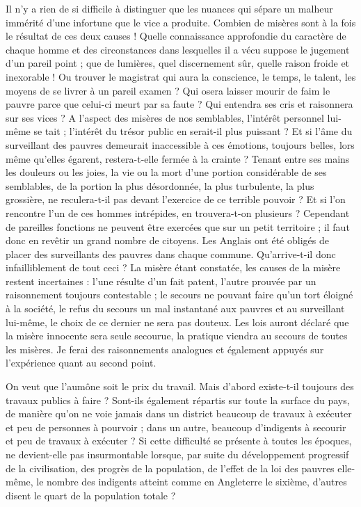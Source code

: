 \documentclass[french,twoside]{book} %
\begin{document}
Il n’y a rien de si difficile à distinguer que les nuances qui sépare un malheur immérité d’une infortune que le vice a produite. Combien de misères sont à la fois le résultat de ces deux causes ! Quelle connaissance approfondie du caractère de chaque homme et des circonstances dans lesquelles il a vécu suppose le jugement d’un pareil point ; que de lumières, quel discernement sûr, quelle raison froide et inexorable ! Ou trouver le magistrat qui aura la conscience, le temps, le talent, les moyens de se livrer à un pareil examen ? Qui osera laisser mourir de faim le pauvre parce que celui-ci meurt par sa faute ? Qui entendra ses cris et raisonnera sur ses vices ? A l’aspect des misères de nos semblables, l’intérêt personnel lui-même se tait ; l’intérêt du trésor public en serait-il plus puissant ? Et si l’âme du surveillant des pauvres demeurait inaccessible à ces émotions, toujours belles, lors même qu’elles égarent, restera-t-elle fermée à la crainte ? Tenant entre ses mains les douleurs ou les joies, la vie ou la mort d’une portion considérable de ses semblables, de la portion la plus désordonnée, la plus turbulente, la plus grossière, ne reculera-t-il pas devant l’exercice de ce terrible pouvoir ? Et si l’on rencontre l’un de ces hommes intrépides, en trouvera-t-on plusieurs ? Cependant de pareilles fonctions ne peuvent être exercées que sur un petit territoire ; il faut donc en revêtir un grand nombre de citoyens. Les Anglais ont été obligés de placer des surveillants des pauvres dans chaque commune. Qu'arrive-t-il donc infailliblement de tout ceci ? La misère étant constatée, les causes de la misère restent incertaines : l’une résulte d’un fait patent, l’autre prouvée par un raisonnement toujours contestable ; le secours ne pouvant faire qu’un tort éloigné à la société, le refus du secours un mal instantané aux pauvres et au surveillant lui-même, le choix de ce dernier ne sera pas douteux. Les lois auront déclaré que la misère innocente sera seule secourue, la pratique viendra au secours de toutes les misères. Je ferai des raisonnements analogues et également appuyés sur l’expérience quant au second point.\par
On veut que l’aumône soit le prix du travail. Mais d’abord existe-t-il toujours des travaux publics à faire ? Sont-ils également répartis sur toute la surface du pays, de manière qu’on ne voie jamais dans un district beaucoup de travaux à exécuter et peu de personnes à pourvoir ; dans un autre, beaucoup d’indigents à secourir et peu de travaux à exécuter ? Si cette difficulté se présente à toutes les époques, ne devient-elle pas insurmontable lorsque, par suite du développement progressif de la civilisation, des progrès de la population, de l’effet de la loi des pauvres elle-même, le nombre des indigents atteint comme en Angleterre le sixième, d’autres disent le quart de la population totale ?\par
\end{document}
